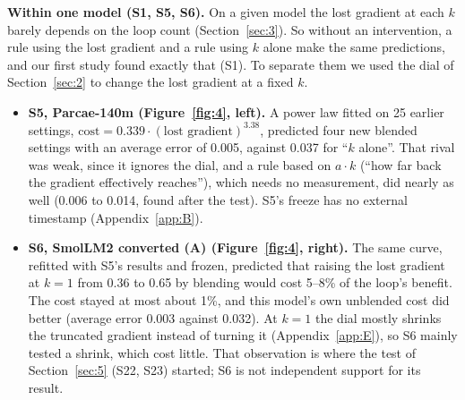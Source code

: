 \documentclass[10pt]{article}
\begin{document}
\textbf{Within one model (S1, S5, S6).} On a given model the lost gradient at each $k$ barely depends on the loop count (Section~\ref{sec:3}). So without an intervention, a rule using the lost gradient and a rule using $k$ alone make the same predictions, and our first study found exactly that (S1). To separate them we used the dial of Section~\ref{sec:2} to change the lost gradient at a fixed $k$.

\begin{itemize}
\item \textbf{S5, Parcae-140m (Figure~\ref{fig:4}, left).} A power law fitted on 25 earlier settings, $\mathrm{cost} = 0.339\cdot(\text{lost gradient})^{3.38}$, predicted four new blended settings with an average error of 0.005, against 0.037 for ``$k$ alone''. That rival was weak, since it ignores the dial, and a rule based on $a\cdot k$ (``how far back the gradient effectively reaches''), which needs no measurement, did nearly as well (0.006 to 0.014, found after the test). S5's freeze has no external timestamp (Appendix~\ref{app:B}).
\item \textbf{S6, SmolLM2 converted (A) (Figure~\ref{fig:4}, right).} The same curve, refitted with S5's results and frozen, predicted that raising the lost gradient at $k = 1$ from 0.36 to 0.65 by blending would cost 5--8\% of the loop's benefit. The cost stayed at most about 1\%, and this model's own unblended cost did better (average error 0.003 against 0.032). At $k = 1$ the dial mostly shrinks the truncated gradient instead of turning it (Appendix~\ref{app:E}), so S6 mainly tested a shrink, which cost little. That observation is where the test of Section~\ref{sec:5} (S22, S23) started; S6 is not independent support for its result.
\end{itemize}
\end{document}
